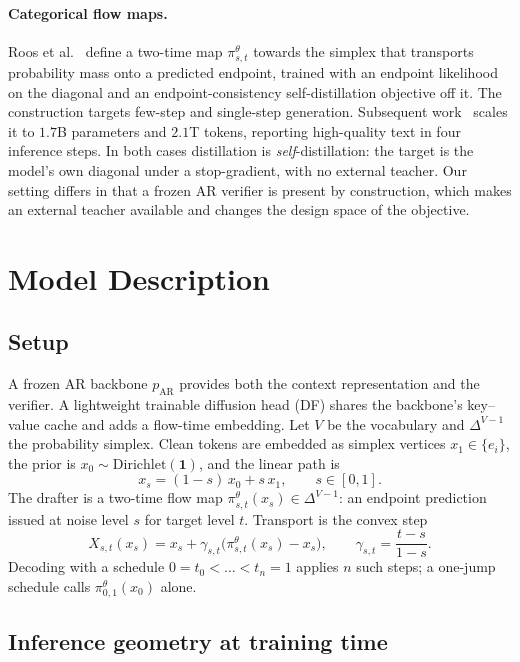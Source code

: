\documentclass{zapiski}
\newcommand{\pmap}[2]{\pi^{\theta}_{#1,#2}}
\newcommand{\pAR}{p_{\mathrm{AR}}}
\begin{document}
\paragraph{Categorical flow maps.} Roos et al.~\cite{roos2026cfm} define a
two-time map $\pmap{s}{t}$ towards the simplex that transports probability mass
onto a predicted endpoint, trained with an endpoint likelihood on the diagonal
and an endpoint-consistency self-distillation objective off it. The
construction targets few-step and single-step generation. Subsequent
work~\cite{davis2026scaling} scales it to $1.7$B parameters and $2.1$T tokens,
reporting high-quality text in four inference steps. In both cases distillation
is \emph{self}-distillation: the target is the model's own diagonal under a
stop-gradient, with no external teacher. Our setting differs in that a frozen
AR verifier is present by construction, which makes an external teacher
available and changes the design space of the objective.

\section{Model Description}
\label{sec:model}

\subsection{Setup}

A frozen AR backbone $\pAR$ provides both the context representation and the
verifier. A lightweight trainable diffusion head (DF) shares the backbone's
key--value cache and adds a flow-time embedding. Let $V$ be the vocabulary and
$\Delta^{V-1}$ the probability simplex. Clean tokens are embedded as simplex
vertices $x_1 \in \{e_i\}$, the prior is $x_0 \sim \mathrm{Dirichlet}(\mathbf{1})$,
and the linear path is
\[
x_s = (1-s)\,x_0 + s\,x_1 , \qquad s \in [0,1].
\]
The drafter is a two-time flow map $\pmap{s}{t}(x_s) \in \Delta^{V-1}$: an
endpoint prediction issued at noise level $s$ for target level $t$. Transport
is the convex step
\[
X_{s,t}(x_s) = x_s + \gamma_{s,t}\bigl(\pmap{s}{t}(x_s) - x_s\bigr),
\qquad \gamma_{s,t} = \frac{t-s}{1-s}.
\]
Decoding with a schedule $0 = t_0 < \dots < t_n = 1$ applies $n$ such steps; a
one-jump schedule calls $\pmap{0}{1}(x_0)$ alone.

\subsection{Inference geometry at training time}
\label{sec:geometry}
\end{document}
